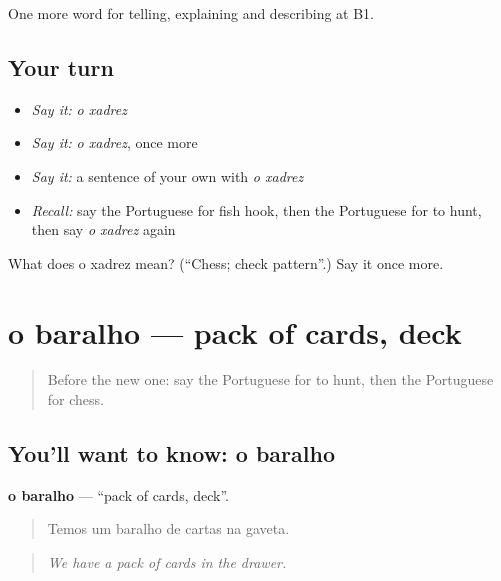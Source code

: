 \begin{grammarlens}[title={What you've built}]
One more word for telling, explaining and describing at B1.
\end{grammarlens}

\subsection*{Your turn}
\begin{itemize}
\raggedright
  \item \emph{Say it:} \emph{o xadrez}
  \item \emph{Say it:} \emph{o xadrez}, once more
  \item \emph{Say it:} a sentence of your own with \emph{o xadrez}
  \item \emph{Recall:} say the Portuguese for fish hook, then the Portuguese for to hunt, then say \emph{o xadrez} again
\end{itemize}

\begin{tcolorbox}[breakable,colback=teal!4,colframe=teal!35!black,title={Before you move on}]
What does o xadrez mean? (\textquotedblleft{}Chess; check pattern\textquotedblright{}.) Say it once more.
\end{tcolorbox}
\section[o baralho]{o baralho — pack of cards, deck}

\label{lesson:PT-C503-baralho}



\begin{quote}
Before the new one: say the Portuguese for to hunt, then the Portuguese for chess.
\end{quote}

\subsection*{You'll want to know: o baralho}
\textbf{o baralho} — \textquotedblleft{}pack of cards, deck\textquotedblright{}.

\begin{quote}
Temos um baralho de cartas na gaveta.
\end{quote}

\begin{quote}
\emph{We have a pack of cards in the drawer.}
\end{quote}

